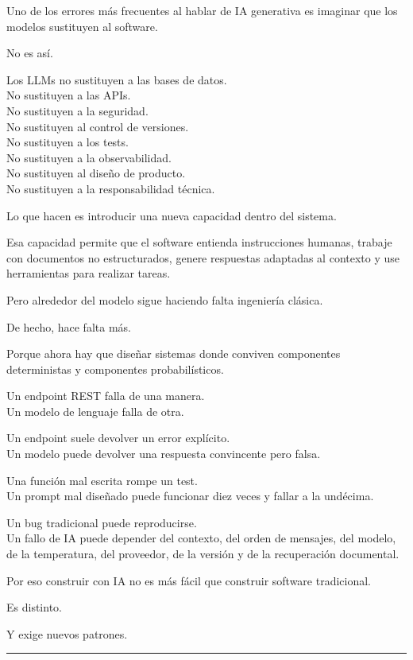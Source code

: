 Uno de los errores más frecuentes al hablar de IA generativa es imaginar
que los modelos sustituyen al software.

No es así.

Los LLMs no sustituyen a las bases de datos.\\
No sustituyen a las APIs.\\
No sustituyen a la seguridad.\\
No sustituyen al control de versiones.\\
No sustituyen a los tests.\\
No sustituyen a la observabilidad.\\
No sustituyen al diseño de producto.\\
No sustituyen a la responsabilidad técnica.

Lo que hacen es introducir una nueva capacidad dentro del sistema.

Esa capacidad permite que el software entienda instrucciones humanas,
trabaje con documentos no estructurados, genere respuestas adaptadas al
contexto y use herramientas para realizar tareas.

Pero alrededor del modelo sigue haciendo falta ingeniería clásica.

De hecho, hace falta más.

Porque ahora hay que diseñar sistemas donde conviven componentes
deterministas y componentes probabilísticos.

Un endpoint REST falla de una manera.\\
Un modelo de lenguaje falla de otra.

Un endpoint suele devolver un error explícito.\\
Un modelo puede devolver una respuesta convincente pero falsa.

Una función mal escrita rompe un test.\\
Un prompt mal diseñado puede funcionar diez veces y fallar a la
undécima.

Un bug tradicional puede reproducirse.\\
Un fallo de IA puede depender del contexto, del orden de mensajes, del
modelo, de la temperatura, del proveedor, de la versión y de la
recuperación documental.

Por eso construir con IA no es más fácil que construir software
tradicional.

Es distinto.

Y exige nuevos patrones.

\begin{center}\rule{0.5\linewidth}{0.5pt}\end{center}

